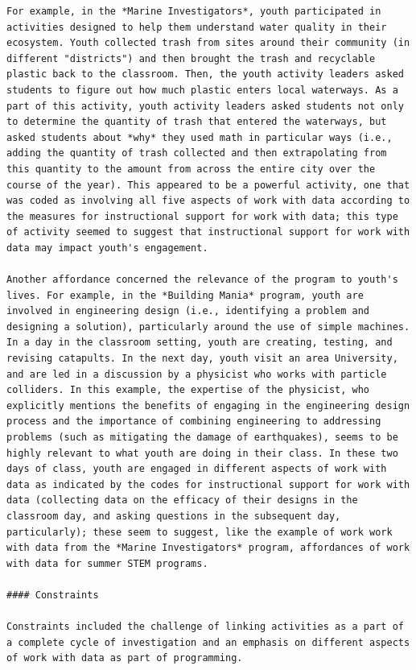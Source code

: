 \documentclass[]{msu-thesis}
\theoremstyle{definition}
\theoremstyle{definition}
\theoremstyle{definition}
\theoremstyle{remark}
\begin{document}
\begin{verbatim}
For example, in the *Marine Investigators*, youth participated in activities designed to help them understand water quality in their ecosystem. Youth collected trash from sites around their community (in different "districts") and then brought the trash and recyclable plastic back to the classroom. Then, the youth activity leaders asked students to figure out how much plastic enters local waterways. As a part of this activity, youth activity leaders asked students not only to determine the quantity of trash that entered the waterways, but asked students about *why* they used math in particular ways (i.e., adding the quantity of trash collected and then extrapolating from this quantity to the amount from across the entire city over the course of the year). This appeared to be a powerful activity, one that was coded as involving all five aspects of work with data according to the measures for instructional support for work with data; this type of activity seemed to suggest that instructional support for work with data may impact youth's engagement.

Another affordance concerned the relevance of the program to youth's lives. For example, in the *Building Mania* program, youth are involved in engineering design (i.e., identifying a problem and designing a solution), particularly around the use of simple machines. In a day in the classroom setting, youth are creating, testing, and revising catapults. In the next day, youth visit an area University, and are led in a discussion by a physicist who works with particle colliders. In this example, the expertise of the physicist, who explicitly mentions the benefits of engaging in the engineering design process and the importance of combining engineering to addressing problems (such as mitigating the damage of earthquakes), seems to be highly relevant to what youth are doing in their class. In these two days of class, youth are engaged in different aspects of work with data as indicated by the codes for instructional support for work with data (collecting data on the efficacy of their designs in the classroom day, and asking questions in the subsequent day, particularly); these seem to suggest, like the example of work work with data from the *Marine Investigators* program, affordances of work with data for summer STEM programs.

#### Constraints

Constraints included the challenge of linking activities as a part of a complete cycle of investigation and an emphasis on different aspects of work with data as part of programming.


\end{verbatim}
\end{document}
